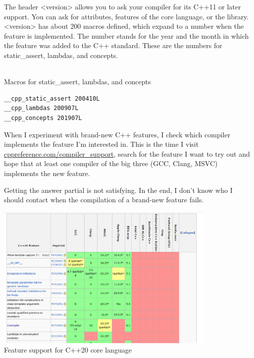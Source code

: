 
The header <version> allows you to ask your compiler for its C++11 or later support. You can ask for attributes, features of the core language, or the library. <version> has about 200 macros defined, which expand to a number when the feature is implemented. The number stands for the year and the month in which the feature was added to the C++ standard. These are the numbers for static\_assert, lambdas, and concepts.

\hspace*{\fill} \\ %
\noindent
Macros for static\_assert, lambdas, and concepts
\begin{lstlisting}[style=styleCXX]
__cpp_static_assert 200410L
__cpp_lambdas 200907L
__cpp_concepts 201907L
\end{lstlisting}

\begin{tcolorbox}[colback=blue!5!white,colframe=blue!75!black,title={Feature Support}]
When I experiment with brand-new C++ features, I check which compiler implements the feature I’m interested in. This is the time I visit \href{https://en.cppreference.com/w/cpp/compiler_support}{cppreference.com/compiler\_support}, search for the feature I want to try out and hope that at least one compiler of the big three (GCC, Clang, MSVC) implements the new feature.

Getting the answer partial is not satisfying. In the end, I don’t know who I should contact when the compilation of a brand-new feature fails.
\end{tcolorbox}

\begin{center}
\includegraphics[width=0.8\textwidth]{content/5/chapter9/images/1.png}\\
Feature support for C++20 core language
\end{center}

